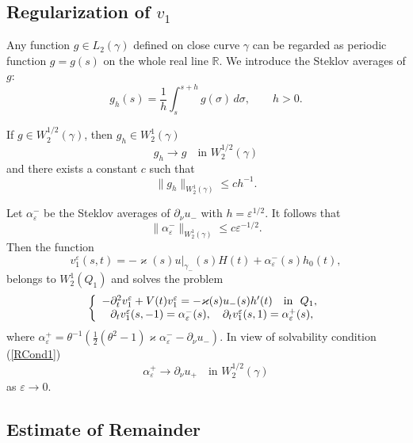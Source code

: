 \documentclass[graybox]{svmult}
\renewcommand{\kappa}{\varkappa}
\newcommand{\Real}{\mathbb R}
\newcommand{\eps}{\varepsilon}
\renewcommand{\leq}{\leqslant}
\newcommand{\eqref}[1]{(\ref{#1})}
\newcommand{\pte}{\partial_t}
\begin{document}
\subsection{Regularization of $v_1$}



Any function $g\in L_2(\gamma)$ defined on close curve $\gamma$ can be regarded as periodic function $g=g(s)$ on the whole real line $\Real$.
We introduce the Steklov averages of $g$:
$$
   g_h(s)=\frac{1}{h}\int_s^{s+h} g(\sigma)\,d\sigma, \qquad h>0.
$$

If $g\in W_2^{1/2}(\gamma)$, then $g_h\in W_2^1(\gamma)$
$$
   g_h\to g \quad \mbox{in } W_2^{1/2}(\gamma)
$$
and there exists a constant $c$ such that
$$
     \|g_h\|_{W_2^1(\gamma)}\leq c h^{-1}.
$$

Let $\alpha_\eps^-$ be the Steklov averages of $\partial_\nu u_-$ with $h=\eps^{1/2}$. It follows that
$$
         \|\alpha_\eps^-\|_{W_2^1(\gamma)}\leq c \eps^{-1/2}.
$$
Then the function
$$
   v_1^\eps(s,t)=-\kappa(s) u|_{\gamma_-}(s)H(t)+\alpha_\eps^-(s)h_0(t),
$$
belongs to $W_2^1(Q_1)$ and solves the problem
\begin{equation}\label{ProblemV1eps}
\left\{
  \begin{array}{ll}
    -\pte^2 v_1^\eps+V(t)v_1^\eps=-\kappa(s)u_-(s)h'(t)\quad \hbox{in \ } Q_1, \\
    \phantom{-}\partial_t v_1^\eps(s, -1)=\alpha_\eps^-(s), \quad
\partial_t v_1^\eps(s, 1)=\alpha_\eps^+(s),
  \end{array}
\right.
\end{equation}
where $ \alpha_\eps^+=\theta^{-1} \left(\textstyle\frac{1}{2 }(\theta^2-1)\kappa \alpha_\eps^--\partial_\nu u_-\right)$. In view of solvability condition \eqref{RCond1}
$$
   \alpha_\eps^+\to \partial_\nu u_+ \quad \mbox{in } W_2^{1/2}(\gamma)
$$
 as $\eps\to 0$.























\subsection{Estimate of Remainder}
\end{document}
